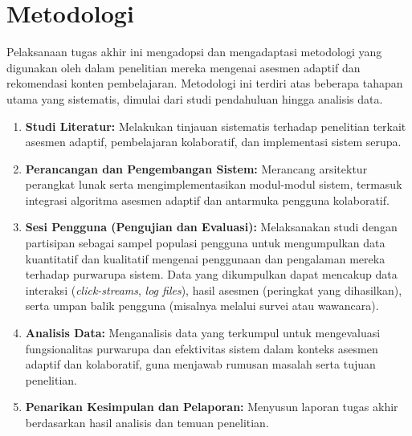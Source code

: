 \section{Metodologi}

Pelaksanaan tugas akhir ini mengadopsi dan mengadaptasi metodologi yang digunakan oleh \textcite{Vesin2022} dalam penelitian mereka mengenai asesmen adaptif dan rekomendasi konten pembelajaran. Metodologi ini terdiri atas beberapa tahapan utama yang sistematis, dimulai dari studi pendahuluan hingga analisis data.

\begin{enumerate}
    \item \textbf{Studi Literatur:} Melakukan tinjauan sistematis terhadap penelitian terkait asesmen adaptif, pembelajaran kolaboratif, dan implementasi sistem serupa.
    
    \item \textbf{Perancangan dan Pengembangan Sistem:} Merancang arsitektur perangkat lunak serta mengimplementasikan modul-modul sistem, termasuk integrasi algoritma asesmen adaptif dan antarmuka pengguna kolaboratif.
    
    \item \textbf{Sesi Pengguna (Pengujian dan Evaluasi):} Melaksanakan studi dengan partisipan sebagai sampel populasi pengguna untuk mengumpulkan data kuantitatif dan kualitatif mengenai penggunaan dan pengalaman mereka terhadap purwarupa sistem. Data yang dikumpulkan dapat mencakup data interaksi (\textit{click-streams}, \textit{log files}), hasil asesmen (peringkat yang dihasilkan), serta umpan balik pengguna (misalnya melalui survei atau wawancara).
    
    \item \textbf{Analisis Data:} Menganalisis data yang terkumpul untuk mengevaluasi fungsionalitas purwarupa dan efektivitas sistem dalam konteks asesmen adaptif dan kolaboratif, guna menjawab rumusan masalah serta tujuan penelitian.
    
    \item \textbf{Penarikan Kesimpulan dan Pelaporan:} Menyusun laporan tugas akhir berdasarkan hasil analisis dan temuan penelitian.
\end{enumerate}

